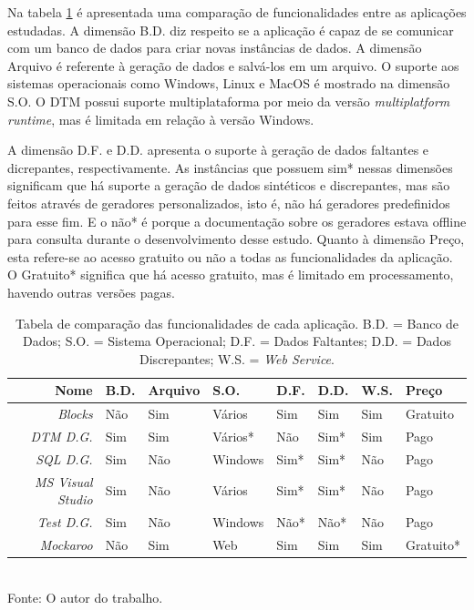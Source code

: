 \documentclass[
	12pt,				%
	openright,			%
	oneside,			%
	a4paper,			%
	english,			%
	brazil				%
	]{abntex2}
\begin{document}
		Na tabela \ref{table: aplicacoes relacionadas} é apresentada uma comparação de funcionalidades entre as aplicações estudadas.
		A dimensão B.D. diz respeito se a aplicação é capaz de se comunicar com um banco de dados para criar novas instâncias de dados.
		A dimensão Arquivo é referente à geração de dados e salvá-los em um arquivo.
		O suporte aos sistemas operacionais como Windows, Linux e MacOS é mostrado na dimensão S.O.
		O DTM possui suporte multiplataforma por meio da versão \emph{multiplatform runtime}, mas é limitada em relação à versão Windows.
		\par
		A dimensão D.F. e D.D. apresenta o suporte à geração de dados faltantes e dicrepantes, respectivamente.
		As instâncias que possuem sim* nessas dimensões significam que há suporte a geração de dados sintéticos e discrepantes, mas são feitos através de geradores personalizados, isto é, não há geradores predefinidos para esse fim.
		E o não* é porque a documentação sobre os geradores estava offline para consulta durante o desenvolvimento desse estudo.
		Quanto à dimensão Preço, esta refere-se ao acesso gratuito ou não a todas as funcionalidades da aplicação.
		O Gratuito* significa que há acesso gratuito, mas é limitado em processamento, havendo outras versões pagas.
		\begin{table}[h]
			\centering
			\caption{Tabela de comparação das funcionalidades de cada aplicação. 
				B.D. = Banco de Dados; 
				S.O. = Sistema Operacional; 
				D.F. = Dados Faltantes;
				D.D. = Dados Discrepantes;
				W.S. = \emph{Web Service}.}
			\vspace{0.5cm}
			\label{table: aplicacoes relacionadas}
			\begin{tabular}{r|lllllll}
			
				Nome                    & B.D. & Arquivo & S.O.    & D.F. & D.D. & W.S. & Preço    \\ %
				\hline                                  %
				\emph{Blocks}           & Não  & Sim     & Vários  & Sim  & Sim  & Sim & Gratuito \\ 
				\emph{DTM D.G.}         & Sim  & Sim     & Vários* & Não  & Sim* & Sim & Pago \\ 
				\emph{SQL D.G.}         & Sim  & Não     & Windows & Sim* & Sim* & Não & Pago \\ 
				\emph{MS Visual Studio} & Sim  & Não     & Vários  & Sim* & Sim* & Não & Pago \\ 
				\emph{Test D.G.}        & Sim  & Não     & Windows & Não* & Não* & Não & Pago \\ 
				\emph{Mockaroo}         & Não  & Sim     & Web     & Sim  & Sim  & Sim & Gratuito* \\ 

			\end{tabular}
			\bigskip
			\\
			\footnotesize Fonte: O autor do trabalho.
		\end{table}
\end{document}
